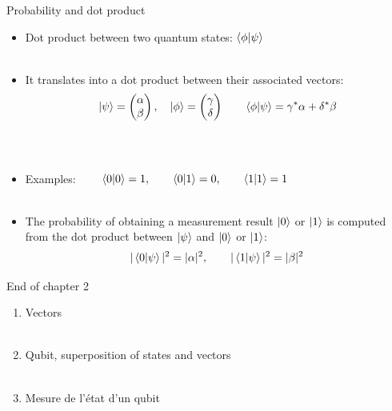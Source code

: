 \documentclass[aspectratio=169,12pt]{beamer}
\begin{document}
\begin{frame}{Probability and dot product}
      \begin{itemize}[<+->]
        \setlength{\itemsep}{0.6em}
        \item Dot product between two quantum states: $\braket{\phi}{\psi}$\\~\\
        \item It translates into a dot product between their associated vectors:\\
         $$\ket \psi = \begin{pmatrix} \alpha \\ \beta \end{pmatrix},\quad  \ket \phi = \begin{pmatrix} \gamma \\ \delta \end{pmatrix} \qquad \braket{\phi}{\psi} =  \gamma^*\alpha + \delta^*\beta$$\\~\\
        \item Examples: $\qquad \braket{0}{0} = 1, \qquad \braket{0}{1} = 0, \qquad \braket{1}{1} = 1$\\~\\
        \item The probability of obtaining a measurement result $\ket  0$ or $\ket 1$ is computed from the dot product between $\ket \psi$ and $\ket 0$ or $\ket 1$:
        $$ |\braket{0}{\psi}|^2 = |\alpha|^2, \qquad  |\braket{1}{\psi}|^2 = |\beta|^2$$
      \end{itemize}
\end{frame}


\begin{frame}{End of chapter 2}
  \begin{enumerate}
    \item Vectors\\~\\
    \item Qubit, superposition of states and vectors\\~\\
    \item Mesure de l'état d'un qubit
  \end{enumerate}
\end{frame}
\end{document}
